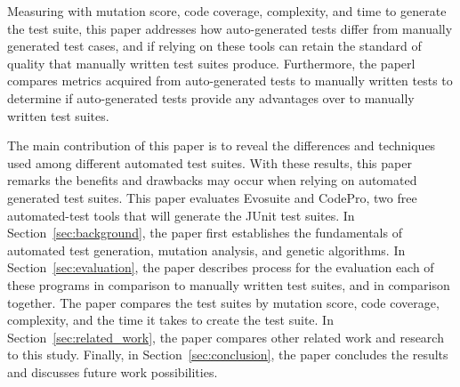 Measuring with mutation score, code coverage, complexity, and time to generate the test suite, this paper addresses how auto-generated tests differ from manually generated test cases, and if relying on these tools can retain the standard of quality that manually written test suites produce. Furthermore, the paperl compares metrics acquired from auto-generated tests to manually written tests to determine if auto-generated tests provide any advantages over to manually written test suites.

The main contribution of this paper is to reveal the differences and techniques used among different automated test suites. With these results, this paper remarks the benefits and drawbacks may occur when relying on automated generated test suites. This paper evaluates Evosuite and CodePro, two free automated-test tools that will generate the JUnit test suites. In Section~\ref{sec:background}, the paper first establishes the fundamentals of automated test generation, mutation analysis, and genetic algorithms. In Section~\ref{sec:evaluation}, the paper describes process for the evaluation each of these programs in comparison to manually written test suites, and in comparison together. The paper compares the test suites by mutation score, code coverage, complexity, and the time it takes to create the test suite. In Section~\ref{sec:related_work}, the paper compares other related work and research to this study. Finally, in Section~\ref{sec:conclusion}, the paper concludes the results and discusses future work possibilities.